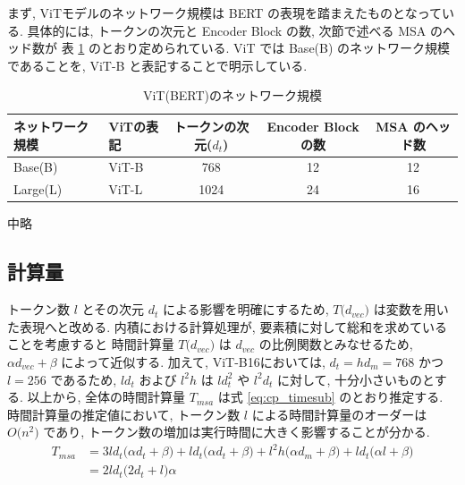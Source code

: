 まず, ViTモデルのネットワーク規模は BERT の表現を踏まえたものとなっている.
具体的には, トークンの次元と Encoder Block の数, 次節で述べる MSA のヘッド数が
表 \ref{table:vit-netsize} のとおり定められている. 
ViT では Base(B) のネットワーク規模であることを, ViT-B と表記することで明示している. 
\begin{table}[htbp]
  \caption{ViT(BERT)のネットワーク規模}
  \label{table:vit-netsize}
  \centering
  \begin{tabular}{l|lccc}
    \hline
    ネットワーク規模 & ViTの表記 & トークンの次元($d_{t}$) & Encoder Block の数 
    & MSA のヘッド数 \\\hline\hline
    Base(B) & ViT-B & 768 & 12 & 12 \\
    Large(L) & ViT-L & 1024 & 24 & 16 \\
    \hline
  \end{tabular}
\end{table}

中略

\subsection{計算量}\label{sec:calc}

トークン数 $l$ とその次元 $d_{t}$ による影響を明確にするため, 
$T \lparen d_{vec} \rparen$ は変数を用いた表現へと改める. 
内積における計算処理が, 要素積に対して総和を求めていることを考慮すると 
時間計算量 $T \lparen d_{vec} \rparen$ は $d_{vec}$ の比例関数とみなせるため, 
$\alpha d_{vec} + \beta$ によって近似する. 
加えて, ViT-B16においては, $d_{t}=hd_{m}=768$ かつ $l=256$ であるため, 
$ld_{t}$ および $l^{2}h$ は $ld_{t}^{2}$ や $l^{2}d_{t}$ に対して, 十分小さいものとする. 
以上から, 全体の時間計算量 $T_{msa}$ は式 \eqref{eq:cp_timesub} のとおり推定する.
時間計算量の推定値において, トークン数 $l$ による時間計算量のオーダーは 
$O \lparen n^{2} \rparen$ であり, トークン数の増加は実行時間に大きく影響することが分かる. 
\begin{align}
  \label{eq:cp_timesub}
  T_{msa} &= 3 l d_{t} \lparen \alpha d_{t} + \beta \rparen + l d_{t} \lparen \alpha d_{t} + \beta \rparen 
  + l^{2} h \lparen \alpha d_{m} + \beta \rparen + l d_{t} \lparen \alpha l + \beta \rparen \nonumber\\
  &= 2 l d_{t} \lparen 2 d_{t} + l \rparen \alpha  
\end{align} 